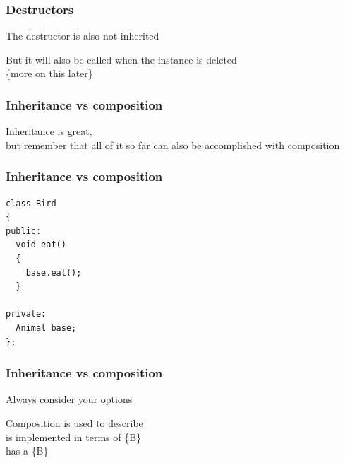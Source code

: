 \documentclass[14pt,a4paper,dvipsnames,usenames]{beamer}
\begin{document}
\begin{frame}[fragile]
  \frametitle{Destructors}

  The destructor is also not inherited

  \vspace{1cm}
  But it will also be called when the instance is deleted\\
  {\footnotesize\{more on this later\}}
  
\end{frame}

\begin{frame}[fragile]
  \frametitle{Inheritance vs composition}

  Inheritance is {\Large\color{FeebleWeek}great},\\[5pt]
but remember that all of it so far can also be accomplished with composition
  
\end{frame}

\begin{frame}[fragile]
  \frametitle{Inheritance vs composition}

  \begin{lstlisting}[morekeywords={Animal,Bird},basicstyle=\fontsize{12pt}{12pt}\selectfont\ttfamily]
class Bird
{
public:
  void eat()
  {
    base.eat();
  }

private:
  Animal base;
};
  \end{lstlisting}

\end{frame}

\begin{frame}[fragile]
  \frametitle{Inheritance vs composition}

  Always consider your options

  \vspace{1cm}
  Composition is used to describe\\[5pt]
   is implemented in terms of {\color{Tropiteal}\{B\}}\\[5pt]
   has a {\color{Tropiteal}\{B\}}\\[5pt]

\end{frame}
\end{document}
